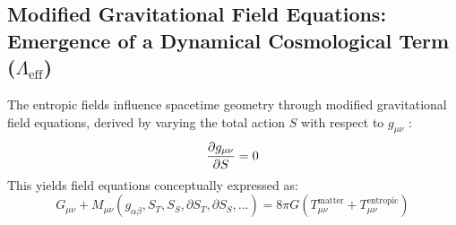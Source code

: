 \documentclass[11pt,a4paper]{article} %
\newcommand{\ST}{S_T}
\newcommand{\SSp}{S_S} %
\newcommand{\Tmu}{T} %
\newcommand{\Mmu}{M} %
\newcommand{\Lambdaeff}{\Lambda_{\text{eff}}}
\begin{document}
\subsection{Modified Gravitational Field Equations: Emergence of a Dynamical Cosmological Term ($\Lambdaeff$)}
The entropic fields influence spacetime geometry through modified gravitational field equations, derived by varying the total action $S$ with respect to $g_{\mu\nu}$ :
\begin{equation}
\label{eq:gravitational_variation}
\pdv{g_{\mu\nu}}{S}=0
\end{equation}
This yields field equations conceptually expressed as:
\begin{equation}
\label{eq:modified_einstein}
G_{\mu\nu}+\Mmu_{\mu\nu}(g_{\alpha\beta},\ST,\SSp,\partial\ST,\partial\SSp,...)=8\pi G(\Tmu^{\text{matter}}_{\mu\nu}+\Tmu^{\text{entropic}}_{\mu\nu})
\end{equation}
\end{document}
